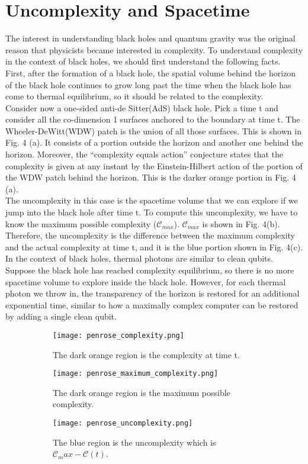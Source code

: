\section{Uncomplexity and Spacetime}
The interest in understanding black holes and quantum gravity was the original reason that physicists became interested in complexity. To understand complexity in the context of black holes, we should first understand the following facts.
\\ 
First, after the formation of a black hole, the spatial volume behind the horizon of the black hole continues to grow long past the time when the black hole has come to thermal equilibrium, so it should be related to the complexity.
\\
Consider now a one-sided anti-de Sitter(AdS) black hole. Pick a time t and consider all the co-dimension 1 surfaces anchored to the boundary at time t. The Wheeler-DeWitt(WDW) patch is the union of all those surfaces. This is shown in Fig. 4 (a). It consists of a portion outside the horizon and another one behind the horizon. Moreover, the “complexity equals action” conjecture states that the complexity is given at any instant by the Einstein-Hilbert action of the portion of the WDW patch behind the horizon. This is the darker orange portion in Fig. 4 (a). 
\\
The uncomplexity in this case is the spacetime volume that we can explore if we jump into the black hole after time t. To compute this uncomplexity, we have to know the maximum possible complexity ($\mathcal{C}_{max}$). $\mathcal{C}_{max}$ is shown in Fig. 4(b). Therefore, the uncomplexity is the difference between the maximum complexity and the actual complexity at time t, and it is the blue portion shown in Fig. 4(c). 
\\
In the context of black holes, thermal photons are similar to clean qubits. Suppose the black hole has reached complexity equilibrium, so there is no more spacetime volume to explore inside the black hole. However, for each thermal photon we throw in, the transparency of the horizon is restored for an additional exponential time, similar to how a maximally complex computer can be restored by adding a single clean qubit.

\begin{figure}[h!]
 \centering
 \begin{subfigure}[b]{0.2\linewidth}
  \texttt{[image: penrose\_complexity.png]}
  \caption{The dark orange region is the complexity at time t.}
 \end{subfigure}
 \begin{subfigure}[b]{0.2\linewidth}
  \texttt{[image: penrose\_maximum\_complexity.png]}
  \caption{The dark orange region is the maximum possible complexity.}
 \end{subfigure}
 \begin{subfigure}[b]{0.2\linewidth}
   \texttt{[image: penrose\_uncomplexity.png]}
   \caption{The blue region is the uncomplexity which is $\mathcal{C}_max - \mathcal{C}(t)$.}
  \end{subfigure}
  \caption{}
\end{figure}